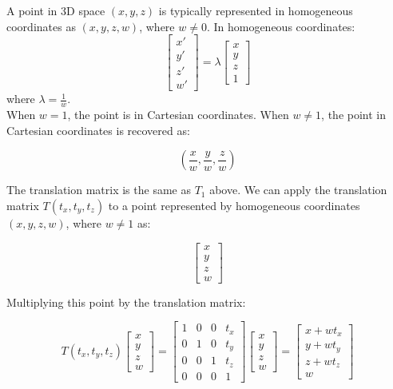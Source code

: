 \documentclass[12pt]{report}
\begin{document}
\begin{enumerate}
    A point in 3D space \((x, y, z)\) is typically represented in homogeneous coordinates as \((x, y, z, w)\), where \(w \neq 0\). In homogeneous coordinates:
    \[
    \begin{bmatrix}
    x' \\
    y' \\
    z' \\
    w'
    \end{bmatrix}
    =
    \lambda
    \begin{bmatrix}
    x \\
    y \\
    z \\
    1
    \end{bmatrix}
    \]
    where \(\lambda = \frac{1}{w}\).\\
    When \(w = 1\), the point is in Cartesian coordinates. When \(w \neq 1\), the point in Cartesian coordinates is recovered as:

    \[
    \left( \frac{x}{w}, \frac{y}{w}, \frac{z}{w} \right)
    \]

    The translation matrix is the same as \(T_1\) above. We can apply the translation matrix \(T(t_x, t_y, t_z)\) to a point represented by homogeneous coordinates
     \((x, y, z, w)\), where \(w \neq 1\) as:

    \[
    \begin{bmatrix}
    x \\
    y \\
    z \\
    w
    \end{bmatrix}
    \]

    Multiplying this point by the translation matrix:

    \[
    T(t_x, t_y, t_z) 
    \begin{bmatrix}
    x \\
    y \\
    z \\
    w
    \end{bmatrix}
    =
    \begin{bmatrix}
    1 & 0 & 0 & t_x \\
    0 & 1 & 0 & t_y \\
    0 & 0 & 1 & t_z \\
    0 & 0 & 0 & 1
    \end{bmatrix}
    \begin{bmatrix}
    x \\
    y \\
    z \\
    w
    \end{bmatrix}
    =
    \begin{bmatrix}
    x + w t_x \\
    y + w t_y \\
    z + w t_z \\
    w
    \end{bmatrix}
    \]
    

\end{enumerate}
\end{document}
